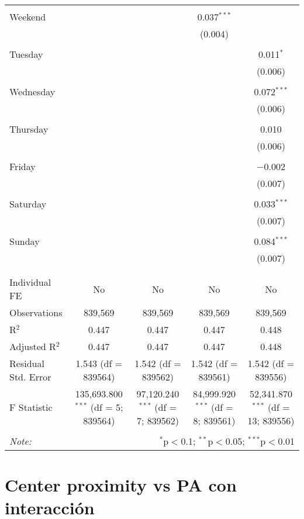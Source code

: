 \documentclass[
]{article}
\begin{document}
\begin{table}[!htbp]
{\begin{tabular}{@{\extracolsep{5pt}}lcccc}
  & & & & \\ 
 Weekend &  &  & 0.037$^{***}$ &  \\ 
  &  &  & (0.004) &  \\ 
  & & & & \\ 
 Tuesday &  &  &  & 0.011$^{*}$ \\ 
  &  &  &  & (0.006) \\ 
  & & & & \\ 
 Wednesday &  &  &  & 0.072$^{***}$ \\ 
  &  &  &  & (0.006) \\ 
  & & & & \\ 
 Thursday &  &  &  & 0.010 \\ 
  &  &  &  & (0.006) \\ 
  & & & & \\ 
 Friday &  &  &  & $-$0.002 \\ 
  &  &  &  & (0.007) \\ 
  & & & & \\ 
 Saturday &  &  &  & 0.033$^{***}$ \\ 
  &  &  &  & (0.007) \\ 
  & & & & \\ 
 Sunday &  &  &  & 0.084$^{***}$ \\ 
  &  &  &  & (0.007) \\ 
  & & & & \\ 
\hline \\[-1.8ex] 
Individual FE & No & No & No & No \\ 
Observations & 839,569 & 839,569 & 839,569 & 839,569 \\ 
R$^{2}$ & 0.447 & 0.447 & 0.447 & 0.448 \\ 
Adjusted R$^{2}$ & 0.447 & 0.447 & 0.447 & 0.448 \\ 
Residual Std. Error & 1.543 (df = 839564) & 1.542 (df = 839562) & 1.542 (df = 839561) & 1.542 (df = 839556) \\ 
F Statistic & 135,693.800$^{***}$ (df = 5; 839564) & 97,120.240$^{***}$ (df = 7; 839562) & 84,999.920$^{***}$ (df = 8; 839561) & 52,341.870$^{***}$ (df = 13; 839556) \\ 
\hline 
\hline \\[-1.8ex] 
\textit{Note:}  & \multicolumn{4}{r}{$^{*}$p$<$0.1; $^{**}$p$<$0.05; $^{***}$p$<$0.01} \\ 
\end{tabular}
} 
\end{table} 
\newpage
\section{Center proximity vs PA con interacción}
\end{document}
